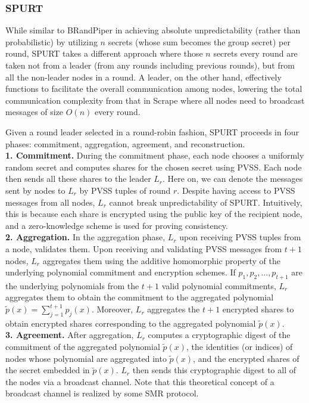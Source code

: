 \documentclass[letterpaper,twocolumn,10pt]{article}
\theoremstyle{definition}
\theoremstyle{remark}
\begin{document}
\subsubsection{SPURT}
While similar to BRandPiper in achieving absolute unpredictability (rather than probabilistic) by utilizing $n$ secrets (whose sum becomes the group secret) per round, SPURT takes a different approach where those $n$ secrets every round are taken not from a leader (from any rounds including previous rounds), but from all the non-leader nodes in a round. A leader, on the other hand, effectively functions to facilitate the overall communication among nodes, lowering the total communication complexity from that in Scrape where all nodes need to broadcast messages of size $O(n)$ every round.

Given a round leader selected in a round-robin fashion, SPURT proceeds in four phases: commitment, aggregation, agreement, and reconstruction.\\

\textbf{1. Commitment.} During the commitment phase, each node chooses a uniformly random secret and computes shares for the chosen secret using PVSS. Each node then sends all these shares to the leader $L_r$. Here on, we can denote the messages sent by nodes to $L_r$ by PVSS tuples of round $r$. Despite having access to PVSS messages from all nodes, $L_r$ cannot break unpredictability of SPURT. Intuitively, this is because each share is encrypted using the public key of the recipient node, and a zero-knowledge scheme is used for proving consistency.\\

\textbf{2. Aggregation.} In the aggregation phase, $L_r$ upon receiving PVSS tuples from a node, validates them. Upon receiving and validating PVSS messages from $t + 1$ nodes, $L_r$ aggregates them using the additive homomorphic property of the underlying polynomial commitment and encryption schemes. If $p_1, p_2, ..., p_{t + 1}$ are the underlying polynomials from the $t + 1$ valid polynomial commitments, $L_r$ aggregates them to obtain the commitment to the aggregated polynomial $\tilde{p}(x) = \sum_{j = 1}^{t + 1} p_j(x)$. Moreover, $L_r$ aggregates the $t + 1$ encrypted shares to obtain encrypted shares corresponding to the aggregated polynomial $\tilde{p}(x)$.\\

\textbf{3. Agreement.} After aggregation, $L_r$ computes a cryptographic digest of the commitment of the aggregated polynomial $\tilde{p}(x)$, the identities (or indices) of nodes whose polynomial are aggregated into $\tilde{p}(x)$, and the encrypted shares of the secret embedded in $\tilde{p}(x)$. $L_r$ then sends this cryptographic digest to all of the nodes via a broadcast channel. Note that this theoretical concept of a broadcast channel is realized by some SMR protocol.
\end{document}
